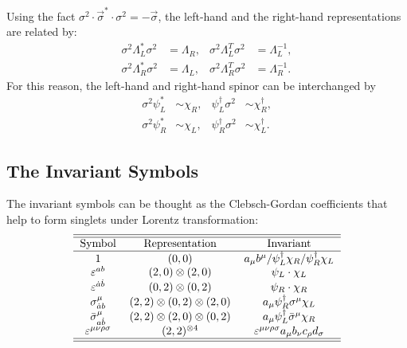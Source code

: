 Using the fact $\sigma^2 \cdot \vec\sigma^* \cdot\sigma^2 = -\vec\sigma$, the left-hand and the right-hand representations are related by:
\begin{equation}
\begin{aligned}
	\sigma^2 \Lambda_L^* \sigma^2 &= \Lambda_R, & \sigma^2 \Lambda_L^T \sigma^2 &= \Lambda_L^{-1}, \\
	\sigma^2 \Lambda_R^* \sigma^2 &= \Lambda_L, & \sigma^2 \Lambda_R^T \sigma^2 &= \Lambda_R^{-1}.
\end{aligned}
\end{equation}
For this reason, the left-hand and right-hand spinor can be interchanged by
\begin{equation}
\begin{aligned}
	\sigma^2 \psi_L^* &\sim \chi_R, & \psi_L^\dagger \sigma^2 &\sim \chi^\dagger_R, \\
	\sigma^2 \psi_R^* &\sim \chi_L, & \psi^\dagger_R \sigma^2 &\sim \chi^\dagger_L.
	\label{eq:left-right-spinor-rel}
\end{aligned}
\end{equation}



\subsection{The Invariant Symbols}
The invariant symbols can be thought as the Clebsch-Gordan coefficients that help to form singlets under Lorentz transformation: 
\begin{equation*}
\begin{tabular}{ccc}
	\hline \hline 
	Symbol & Representation  & Invariant \\ \hline
	$1$ & $(0,0)$ & $a_\mu b^\mu/\psi_L^\dagger \chi_R/\psi_R^\dagger \chi_L$\\
	$\varepsilon^{ab}$ & $(2,0)\otimes (2,0)$ & $\psi_L \cdot \chi_L$ \\
	$\varepsilon^{\dot a \dot b}$ & $(0,2)\otimes (0,2)$ & $\psi_R \cdot \chi_R$ \\
	$\sigma^\mu_{\dot ab}$ & $(2,2)\otimes (0,2)\otimes(2,0)$ & $a_\mu \psi_R^\dagger \sigma^\mu \chi_L$ \\
	$\bar \sigma^\mu_{a \dot b}$ & $(2,2)\otimes (2,0)\otimes(0,2)$ & $a_\mu \psi_L^\dagger \bar\sigma^\mu \chi_R$ \\
	$\varepsilon^{\mu\nu\rho\sigma}$ & $(2,2)^{\otimes 4}$ & $\varepsilon^{\mu\nu\rho\sigma}a_\mu b_\nu c_\rho d_\sigma$ \\
	\hline \hline
\end{tabular}
\end{equation*}

